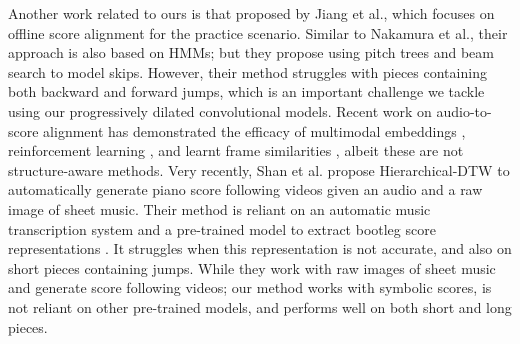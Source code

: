 \documentclass{article}
\begin{document}
Another work related to ours is that proposed by Jiang et al.\cite{jiang2019offline}, which  focuses on offline score alignment for the practice scenario. Similar to Nakamura et al.\cite{nakamura2015real}, their approach is also based on HMMs; but they propose using pitch trees and beam search to model skips. However, their method struggles with pieces containing both backward and forward jumps, which is an important challenge we tackle using our progressively dilated convolutional models.
Recent work on audio-to-score alignment has demonstrated the efficacy of multimodal embeddings \cite{dorfer2018learning}, reinforcement learning \cite{dorfer2018learning2}, \cite{henkel2019score} and learnt frame similarities \cite{agrawal2021learning}, albeit these are not structure-aware methods. Very recently, Shan et al. propose Hierarchical-DTW \cite{shan2020improved} to automatically generate piano score following videos given an audio and a raw image of sheet music. Their method is reliant on an automatic music transcription system \cite{hawthorne2017onsets} and a pre-trained model to extract bootleg score representations \cite{tanprasert2020midi}. It struggles when this representation is not accurate, and also on short pieces containing jumps. While they work with raw images of sheet music and generate score following videos; our method works with symbolic scores, is not reliant on other pre-trained models, and performs well on both short and long pieces. 
\begin{comment}
\par Apart from alignment-specific research, work on analyzing music structure in MIR is moving towards machine learning based methods \cite{serra2014unsupervised}, \cite{ullrich2014boundary}, \cite{mcfee2014analyzing}, and \cite{grill2015music}.
While these methods focus on analyzing the content of a single piece or a performance, with tasks such as boundary detection  \cite{ullrich2014boundary}, \cite{grill2015music} and music structure annotation \cite{mcfee2014analyzing}, our research inherently differs from them in that it is primarily concerned with the alignment of a performance to the score for a given piece of music. 
\end{comment}
\end{document}
